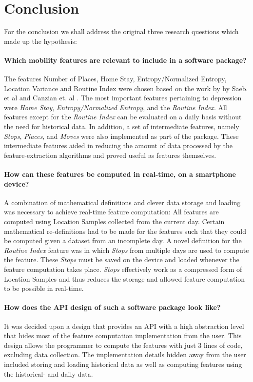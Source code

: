 \chapter{Conclusion}
\label{chapter:08}

For the conclusion we shall address the original three research questions which made up the hypothesis:

\subsubsection*{Which mobility features are relevant to include in a software package?}
The features Number of Places, Home Stay, Entropy/Normalized Entropy, Location Variance and Routine Index were chosen based on the work by by Saeb. et al \cite{Saeb2015} and Canzian et. al \cite{Canzian2015}. The most important features pertaining to depression were \textit{Home Stay}, \textit{Entropy/Normalized Entropy}, and the \textit{Routine Index}. All features except for the \textit{Routine Index} can be evaluated on a daily basis without the need for historical data. In addition, a set of intermediate features, namely \textit{Stops}, \textit{Places}, and \textit{Moves} were also implemented as part of the package. These intermediate features aided in reducing the amount of data processed by the feature-extraction algorithms and proved useful as features themselves.

\subsubsection*{How can these features be computed in real-time, on a smartphone device?}
A combination of mathematical definitions and clever data storage and loading was necessary to achieve real-time feature computation: All features are computed using Location Samples collected from the current day. Certain mathematical re-definitions had to be made for the features such that they could be computed given a dataset from an incomplete day. A novel definition for the \textit{Routine Index} feature was in which \textit{Stops} from multiple days are used to compute the feature. These \textit{Stops} must be saved on the device and loaded whenever the feature computation takes place. \textit{Stops} effectively work as a compressed form of Location Samples and thus reduces the storage and allowed feature computation to be possible in real-time.

\subsubsection*{How does the API design of such a software package look like?}
It was decided upon a design that provides an API with a high abstraction level that hides most of the feature computation implementation from the user. This design allows the programmer to compute the features with just 3 lines of code, excluding data collection. The implementation details hidden away from the user included storing and loading historical data as well as computing features using the historical- and daily data. 

